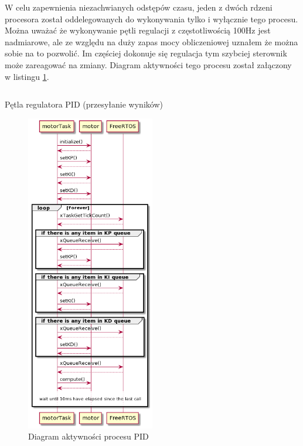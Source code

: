      W celu zapewnienia niezachwianych odstępów czasu, jeden z dwóch rdzeni procesora został oddelegowanych do wykonywania tylko i wyłącznie tego procesu. Można uważać że wykonywanie pętli regulacji z częstotliwością 100Hz jest nadmiarowe, ale ze względu na duży zapas mocy obliczeniowej uznałem że można sobie na to pozwolić. Im częściej dokonuje się regulacja tym szybciej sterownik może zareagować na zmiany. Diagram aktywności tego procesu został załączony w listingu \ref{fig:pid_plantuml}. 
     
     
    \begin{kod}
      \inputminted[firstline=27]{cpp}{esp/listings/pid.cpp}
      \caption{Pętla regulatora PID (przesyłanie wyników)}
      \label{code:pid3}
      \vspace{2em}
    \end{kod}
    
                  
    \begin{figure}[ht]
        \centering
        \includegraphics[width=0.5\textwidth]{img/motorTask_uml.png}
        \caption{Diagram aktywności procesu PID}
        \label{fig:pid_plantuml}
    \end{figure}